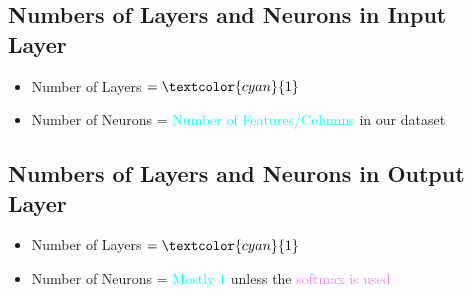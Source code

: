 \documentclass{book}
\begin{document}
\subsection{Numbers of Layers and Neurons in Input Layer}
\begin{itemize}
    \item Number of Layers \(= \textcolor{cyan}{1}\)
    \item Number of Neurons = \textcolor{cyan}{Number of Features/Columns} in our dataset
\end{itemize}
\subsection{Numbers of Layers and Neurons in Output Layer}
\begin{itemize}
    \item Number of Layers \(= \textcolor{cyan}{1}\)
    \item Number of Neurons = \textcolor{cyan}{Mostly $1$} unless the \textcolor{violet}{softmax is used}
\end{itemize}
\end{document}
